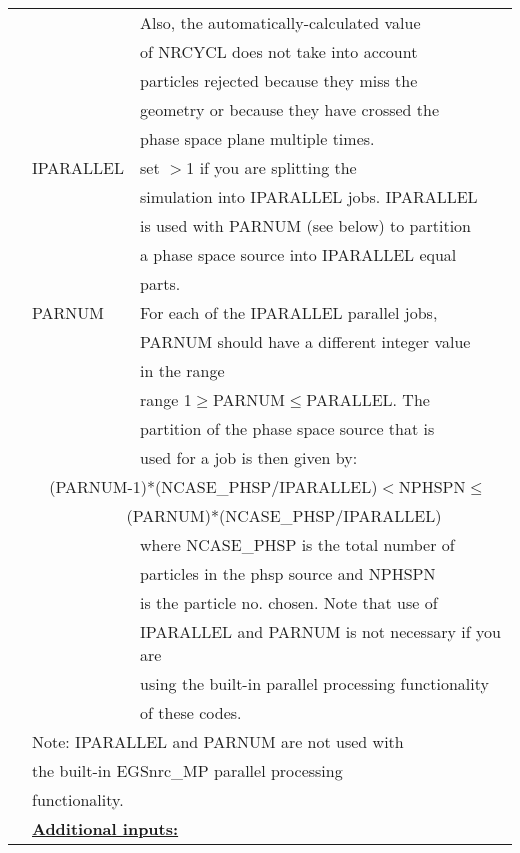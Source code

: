 \begin{longtable}{lll}
  &         & Also, the automatically-calculated value\\
  &         & of NRCYCL does not take into account\\
  &         & particles rejected because they miss the\\
  &         & geometry or because they have crossed the\\
  &         & phase space plane multiple times.\\
  & IPARALLEL & set $>$1 if you are splitting the\\
  &         & simulation into IPARALLEL jobs.  IPARALLEL\\
  &         & is used with PARNUM (see below) to partition\\
  &         & a phase space source into IPARALLEL equal\\
  &         & parts.\\
  & PARNUM  & For each of the IPARALLEL parallel jobs,\\
  &         & PARNUM should have a different integer value\\
  &         & in the range\\
  &         & range 1$\geq$PARNUM$\leq$PARALLEL.  The\\
  &         & partition of the phase space source that is\\
  &         & used for a job is then given by:\\
  & \multicolumn{2}{c}{(PARNUM-1)*(NCASE\_PHSP/IPARALLEL)$<$NPHSPN$\leq$}\\
  & \multicolumn{2}{c}{~~~~(PARNUM)*(NCASE\_PHSP/IPARALLEL)}\\
  &         &  where NCASE\_PHSP is the total number of\\
  &         & particles in the phsp source and NPHSPN\\
  &         & is the particle no. chosen.  Note that use of\\
  &         & IPARALLEL and PARNUM is not necessary if you are\\
  &         & using the built-in parallel processing functionality\\
  &         & of these codes.\\
  & \multicolumn{2}{l}{Note: IPARALLEL and PARNUM are not used with}\\
  & \multicolumn{2}{l}{the built-in EGSnrc\_MP parallel processing}\\
  & \multicolumn{2}{l}{functionality.}\\
  & \multicolumn{2}{l}{\bf \underline {Additional inputs:}}\\

\end{longtable}
